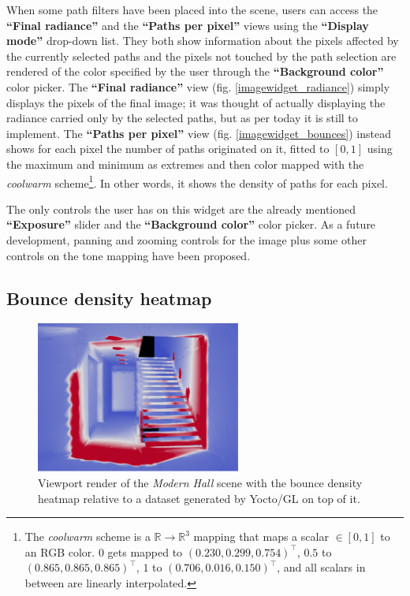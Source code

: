 When some path filters have been placed into the scene, users can access the \textbf{“Final radiance”} and the \textbf{“Paths per pixel”} views using the \textbf{“Display mode”} drop-down list. They both show information about the pixels affected by the currently selected paths and the pixels not touched by the path selection are rendered of the color specified by the user through the \textbf{“Background color”} color picker. The \textbf{“Final radiance”} view (fig. \ref{imagewidget_radiance}) simply displays the pixels of the final image; it was thought of actually displaying the radiance carried only by the selected paths, but as per today it is still to implement. The \textbf{“Paths per pixel”} view (fig. \ref{imagewidget_bounces}) instead shows for each pixel the number of paths originated on it, fitted to $[0,1]$ using the maximum and minimum as extremes and then color mapped with the \textit{coolwarm} scheme\footnote{The \textit{coolwarm} scheme is a $\mathbb{R} \to \mathbb{R}^3$ mapping that maps a scalar $\in[0,1]$ to an RGB color. $0$ gets mapped to $(0.230, 0.299, 0.754)^\intercal$, $0.5$ to $(0.865, 0.865, 0.865)^\intercal$, $1$ to $(0.706, 0.016, 0.150)^\intercal$, and all scalars in between are linearly interpolated.}. In other words, it shows the density of paths for each pixel.

The only controls the user has on this widget are the already mentioned \textbf{“Exposure”} slider and the \textbf{“Background color”} color picker. As a future development, panning and zooming controls for the image plus some other controls on the tone mapping have been proposed.

\subsection{Bounce density heatmap}
\label{heatmap}

\begin{figure}
	\centering
	\includegraphics[width=0.6\textwidth]{chapters/chapter_thetool/heatmap}
	\caption{Viewport render of the \textit{Modern Hall} \cite{bitterliscenes} scene with the bounce density heatmap relative to a dataset generated by Yocto/GL \cite{pellacini2019yocto} on top of it.}
	\label{heatmap}
\end{figure}

